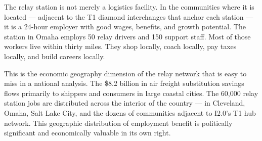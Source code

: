 The relay station is not merely a logistics facility. In the communities where it
is located --- adjacent to the T1 diamond interchanges that anchor each station
\citep{ROUTE_C2} --- it is a 24-hour employer with good wages, benefits, and growth
potential. The station in Omaha employs 50 relay drivers and 150 support staff.
Most of those workers live within thirty miles. They shop locally, coach locally,
pay taxes locally, and build careers locally.

This is the economic geography dimension of the relay network that is easy to miss
in a national analysis. The \$8.2 billion in air freight substitution savings flows
primarily to shippers and consumers in large coastal cities. The 60,000 relay station
jobs are distributed across the interior of the country --- in Cleveland, Omaha,
Salt Lake City, and the dozens of communities adjacent to I2.0's T1 hub network.
This geographic distribution of employment benefit is politically significant and
economically valuable in its own right.

